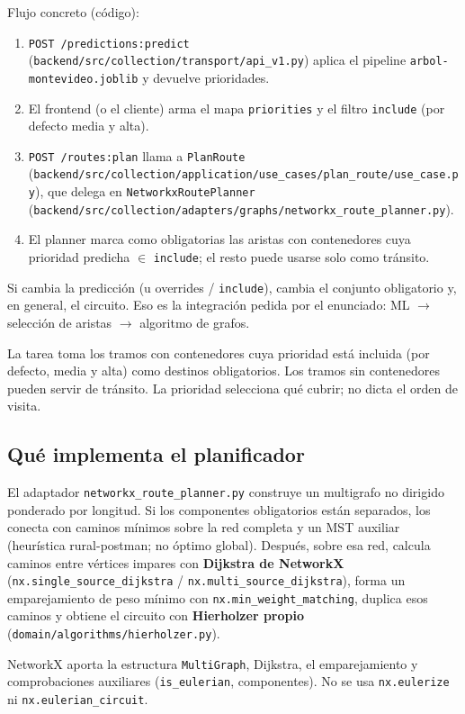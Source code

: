 \documentclass[11pt,a4paper]{article}
\begin{document}
Flujo concreto (código):
\begin{enumerate}[leftmargin=*]
\item \texttt{POST /predictions:predict} (\texttt{backend/src/collection/transport/api\_v1.py}) aplica el pipeline \texttt{arbol-montevideo.joblib} y devuelve prioridades.
\item El frontend (o el cliente) arma el mapa \texttt{priorities} y el filtro \texttt{include} (por defecto media y alta).
\item \texttt{POST /routes:plan} llama a \texttt{PlanRoute} (\texttt{backend/src/collection/application/use\_cases/plan\_route/use\_case.py}), que delega en \texttt{NetworkxRoutePlanner} (\texttt{backend/src/collection/adapters/graphs/networkx\_route\_planner.py}).
\item El planner marca como obligatorias las aristas con contenedores cuya prioridad predicha $\in$ \texttt{include}; el resto puede usarse solo como tránsito.
\end{enumerate}
Si cambia la predicción (u overrides / \texttt{include}), cambia el conjunto obligatorio y, en general, el circuito. Eso es la integración pedida por el enunciado: ML $\rightarrow$ selección de aristas $\rightarrow$ algoritmo de grafos.

La tarea toma los tramos con contenedores cuya prioridad está incluida (por defecto, media y alta) como destinos obligatorios. Los tramos sin contenedores pueden servir de tránsito. La prioridad selecciona qué cubrir; no dicta el orden de visita.

\subsection{Qué implementa el planificador}
El adaptador \texttt{networkx\_route\_planner.py} construye un multigrafo no dirigido ponderado por longitud. Si los componentes obligatorios están separados, los conecta con caminos mínimos sobre la red completa y un MST auxiliar (heurística rural-postman; no óptimo global). Después, sobre esa red, calcula caminos entre vértices impares con \textbf{Dijkstra de NetworkX} (\texttt{nx.single\_source\_dijkstra} / \texttt{nx.multi\_source\_dijkstra}), forma un emparejamiento de peso mínimo con \texttt{nx.min\_weight\_matching}, duplica esos caminos y obtiene el circuito con \textbf{Hierholzer propio} (\texttt{domain/algorithms/hierholzer.py}).

NetworkX aporta la estructura \texttt{MultiGraph}, Dijkstra, el emparejamiento y comprobaciones auxiliares (\texttt{is\_eulerian}, componentes). No se usa \texttt{nx.eulerize} ni \texttt{nx.eulerian\_circuit}.
\end{document}
